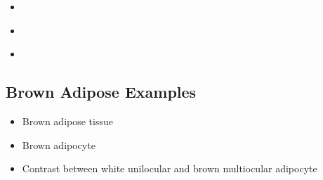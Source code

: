 \begin{itemize}
\begin{multicols}{2}
\begin{itemize}
    \begin{center}
    \end{center}
    
    \item {}
    
    \begin{center}
    \end{center}

    \item {}
  
    \begin{center}
    \end{center}

    \item {} 
    
    \begin{center}
    \end{center}
  \end{itemize}
  \end{multicols}

  \newpage
  \subsection{Brown Adipose Examples}
  \begin{itemize}
    \item Brown adipose tissue
    
    \begin{center}
    \end{center}
    
    \item Brown adipocyte
    
    \begin{center}
    \end{center}
    
    \item Contrast between white unilocular and brown multiocular adipocyte
    
    \begin{center}
    \end{center}
  \end{itemize}
\end{itemize}

